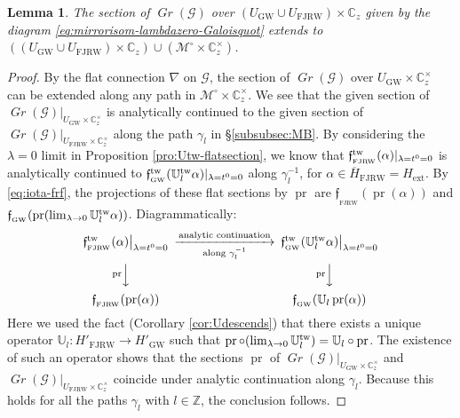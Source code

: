 \documentclass[11pt]{amsart}
\newtheorem{lem}[thm]{Lemma} %
\theoremstyle{definition} %
\theoremstyle{remark} %
\newcommand{\CC}{\mathbb C}
\newcommand{\UU}{\mathbb U}
\newcommand{\ZZ}{\mathbb Z}
\newcommand{\tw}{{\rm tw}}
\def\GW{\operatorname{\text{GW}}}
\newcommand{\cMo}{\mathcal{M}^\circ}
\newcommand{\cG}{\mathcal{G}}
\newcommand{\frf}{\mathfrak{f}}
\newcommand{\ext}{{\operatorname{ext}}}
\newcommand{\FJRW}{{\operatorname{FJRW}}}
\newcommand{\sFJRW}{\operatorname{_{FJRW}}}
\renewcommand{\GW}{{\operatorname{GW}}}
\newcommand{\sGW}{\operatorname{_{GW}}}
\newcommand{\Grass}{\operatorname{\mathit{Gr}}} %
\newcommand{\pr}{\operatorname{pr}}
\newcommand{\ov}{\overline}
\begin{document}
\begin{lem} 
The section of $\Grass(\cG)$ over 
$(U_{\GW} \cup U_{\FJRW} )\times \CC_z$ given by 
the diagram \eqref{eq:mirrorisom-lambdazero-Galoisquot}
extends to $((U_{\GW}\cup U_{\FJRW})\times \CC_z) \cup 
(\cMo\times \CC_z^\times)$. 
\end{lem} 
\begin{proof} 
By the flat connection $\nabla$ on $\cG$, 
the section of $\Grass(\cG)$ over $U_{\GW}\times \CC_z^\times$ 
can be extended along any path in $\cMo\times \CC_z^\times$.  
We see that the given section of 
$\Grass(\cG)|_{U_{\GW}\times \CC_z^\times}$ 
is analytically continued to the given section of 
$\Grass(\cG)|_{U_{\FJRW}\times \CC_z^\times}$ 
along the path $\gamma_l$ in \S \ref{subsubsec:MB}. 
By considering the $\lambda=0$ limit 
in Proposition \ref{pro:Utw-flatsection}, we know that 
$\frf^\tw_{\sFJRW}(\alpha)|_{\lambda=t^0=0}$ 
is analytically continued to 
$\frf_{\sGW}^\tw(\UU_l^\tw \alpha)|_{\lambda=t^0=0}$ 
along $\gamma_l^{-1}$, for $\alpha \in \ov{H}_\FJRW = H_\ext$. 
By \eqref{eq:iota-frf}, the projections of these flat 
sections by $\pr$ are $\frf_{\sFJRW}(\pr(\alpha))$ 
and $\frf_{\sGW}(\pr(  \lim_{\lambda \to 0}\UU_l^\tw \alpha) )$. 
Diagrammatically: 
\begin{equation} 
\label{eq:ancont-frf}
\begin{CD}
\frf^\tw_{\sFJRW}(\alpha)\bigr |_{\lambda=t^0=0} 
@>{\text{analytic continuation}}>{\text{along $\gamma_l^{-1}$}}> 
\frf_{\sGW}^\tw(\UU_l^\tw \alpha)\bigr |_{\lambda=t^0=0} \\ 
@V{\pr}VV @V{\pr}VV \\
\frf_{\sFJRW}(\pr(\alpha))  @. \frf_{\sGW}(\UU_l \pr( \alpha) )  
\end{CD} 
\end{equation} 
Here we used the fact (Corollary \ref{cor:Udescends}) 
that there exists a unique operator 
$\UU_l \colon H'_{\FJRW} \to H'_{\GW}$ such that 
$\pr \circ (\lim_{\lambda \to 0} \UU^\tw_l) = \UU_l \circ \pr$. 
The existence of such an operator shows that 
the sections $\pr$ of $\Grass(\cG)|_{U_{\GW}\times \CC_z^\times}$ and 
$\Grass(\cG)|_{U_{\FJRW}\times \CC_z^\times}$ coincide under analytic 
continuation along $\gamma_l$. 
Because this holds for all the paths $\gamma_l$ with $l \in \ZZ$, 
the conclusion follows. 
\end{proof} 
\end{document}
